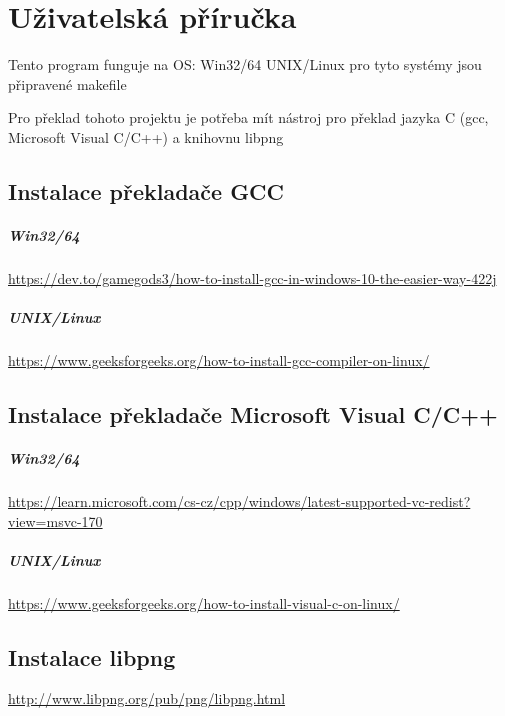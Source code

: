 \documentclass[12pt]{report}
\begin{document}
    \chapter{Uživatelská příručka}
    Tento program funguje na OS:
    Win32/64
    UNIX/Linux
    pro tyto systémy jsou připravené makefile

    Pro překlad tohoto projektu je potřeba mít nástroj pro překlad jazyka C (gcc, Microsoft Visual C/C++) a knihovnu libpng


    \section{Instalace překladače GCC}
    
\paragraph{Win32/64}
    \href{https://dev.to/gamegods3/how-to-install-gcc-in-windows-10-the-easier-way-422j}{https://dev.to/gamegods3/how-to-install-gcc-in-windows-10-the-easier-way-422j}
  
\paragraph{UNIX/Linux}
    \href{https://www.geeksforgeeks.org/how-to-install-gcc-compiler-on-linux/}{https://www.geeksforgeeks.org/how-to-install-gcc-compiler-on-linux/}


    \section{Instalace překladače Microsoft Visual C/C++}
    
\paragraph{Win32/64}

    \href{https://learn.microsoft.com/cs-cz/cpp/windows/latest-supported-vc-redist?view=msvc-170}{https://learn.microsoft.com/cs-cz/cpp/windows/latest-supported-vc-redist?view=msvc-170}
    
\paragraph{UNIX/Linux}
    \href{https://www.geeksforgeeks.org/how-to-install-visual-c-on-linux/}{https://www.geeksforgeeks.org/how-to-install-visual-c-on-linux/}


    \section{Instalace libpng}
    \href{http://www.libpng.org/pub/png/libpng.htm}{http://www.libpng.org/pub/png/libpng.html}
\end{document}
